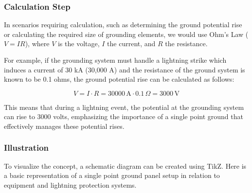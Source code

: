 \subsubsection{Calculation Step}

In scenarios requiring calculation, such as determining the ground potential rise or calculating the required size of grounding elements, we would use Ohm's Law (\(V = IR\)), where \(V\) is the voltage, \(I\) the current, and \(R\) the resistance. 

For example, if the grounding system must handle a lightning strike which induces a current of 30 kA (30,000 A) and the resistance of the ground system is known to be 0.1 ohms, the ground potential rise can be calculated as follows:

\[
V = I \cdot R = 30000 \, \text{A} \cdot 0.1 \, \Omega = 3000 \, \text{V}
\]

This means that during a lightning event, the potential at the grounding system can rise to 3000 volts, emphasizing the importance of a single point ground that effectively manages these potential rises.

\subsubsection{Illustration}

To visualize the concept, a schematic diagram can be created using TikZ. Here is a basic representation of a single point ground panel setup in relation to equipment and lightning protection systems.

\begin{center}
\end{center}
